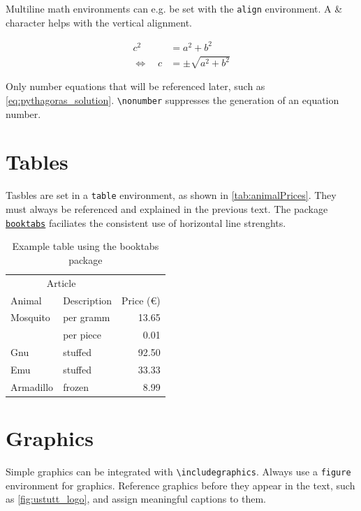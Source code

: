 Multiline math environments can e.g. be set with the \texttt{align} environment. A \& character helps with the vertical alignment.

\begin{align}
c^2 &= a^2 + b^2 \nonumber \\
\Leftrightarrow \quad c &= \pm \sqrt{a^2 + b^2} \label{eq:pythagoras_solution}
\end{align}


Only number equations that will be referenced later, such as \autoref{eq:pythagoras_solution}. 
\texttt{\textbackslash nonumber} suppresses the generation of an equation number.

\section{Tables}

Tasbles are set in a \texttt{table} environment, as shown in \autoref{tab:animalPrices}.
They must always be referenced and explained in the previous text.
The package \href{https://ctan.kako-dev.de/macros/latex/contrib/booktabs/booktabs.pdf}{\texttt{booktabs}} faciliates the consistent use of horizontal line strenghts.

    \begin{table}[htb]
    \centering
    \begin{tabular}{@{}llr@{}} \toprule
    \multicolumn{2}{c}{Article}             \\ \cmidrule(r){1-2}
        Animal   & Description  & Price (€) \\ \midrule
        Mosquito & per gramm    & 13.65     \\
                 & per piece    & 0.01      \\
        Gnu      & stuffed      & 92.50     \\
        Emu      & stuffed      & 33.33     \\
        Armadillo& frozen       & 8.99      \\ \bottomrule
    \end{tabular}
    \caption{Example table using the booktabs package} 
    \label{tab:animalPrices}
    \end{table}

\section{Graphics}

Simple graphics can be integrated with \texttt{\textbackslash includegraphics}. Always use a \texttt{figure} environment for graphics. Reference graphics before they appear in the text, such as \autoref{fig:ustutt_logo}, and assign meaningful captions to them.

